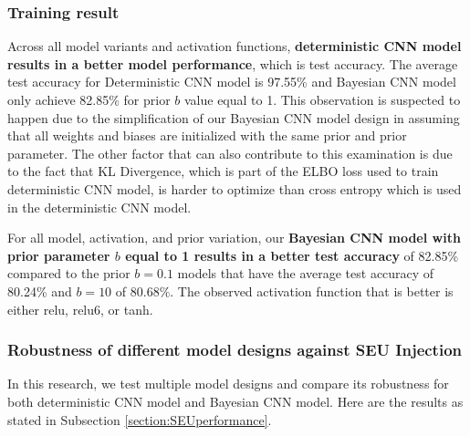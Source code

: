 \documentclass[ %
                    author={Revalda Putawara},
                supervisor={Dr. James Pope},
                    degree={MSc},
                     title={Robustness of Bayesian Neural Networks Design Choices Against Weight and Bias Perturbation Induced by Single Event Upsets (SEUs)},
                      type={},
                      year={2025}]{dissertation}
\begin{document}
\subsubsection{Training result}

Across all model variants and activation functions, \textbf{deterministic CNN model results in a better model performance}, which is test accuracy. The average test accuracy for Deterministic CNN model is 97.55\% and Bayesian CNN model only achieve 82.85\% for prior $b$ value equal to 1. This observation is suspected to happen due to the simplification of our Bayesian CNN model design in assuming that all weights and biases are initialized with the same prior and prior parameter. The other factor that can also contribute to this examination is due to the fact that KL Divergence, which is part of the ELBO loss used to train deterministic CNN model, is harder to optimize than cross entropy which is used in the deterministic CNN model.

For all model, activation, and prior variation, our \textbf{Bayesian CNN model with prior parameter $b$ equal to 1 results in a better test accuracy} of 82.85\% compared to the prior $b=0.1$ models that have the average test accuracy of 80.24\% and $b=10$ of $80.68\%$. The observed activation function that is better is either relu, relu6, or tanh.

\subsubsection{Robustness of different model designs against SEU Injection}

In this research, we test multiple model designs and compare its robustness for both deterministic CNN model and Bayesian CNN model. Here are the results as stated in Subsection \ref{section:SEUperformance}.
\end{document}
